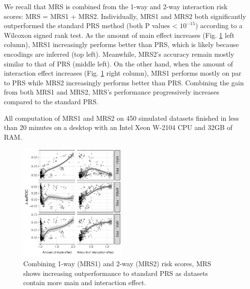 \documentclass[a4paper,twoside, 9pt]{article}
\begin{document}
\noindent We recall that MRS is combined from the 1-way and 2-way interaction risk scores: MRS = MRS1 + MRS2.
Individually, MRS1 and MRS2 both significantly outperformed the standard
PRS method (both P values \textless{} \(10^{-15}\)) according to a
Wilcoxon signed rank test. As the amount of main effect increases (Fig.
\ref{fig:improvements} left column), MRS1 increasingly performs better
than PRS, which is likely because encodings are inferred (top left).
Meanwhile, MRS2's accuracy remain mostly similar to that of PRS (middle
left). On the other hand, when the amount of interaction effect
increases (Fig. \ref{fig:improvements} right column), MRS1 performs
mostly on par to PRS while MRS2 increasingly performs better than PRS.
Combining the gain from both MRS1 and MRS2, MRS's performance
progressively increases compared to the standard PRS.

All computation of MRS1 and MRS2 on 450 simulated datasets finished in less than 20 minutes on a desktop with an Intel Xeon W-2104 CPU and 32GB of RAM.

\begin{figure}
\centering
\includegraphics[width=0.48\textwidth]{images/improvements_train_ms.pdf}
\caption{Combining 1-way (MRS1) and 2-way (MRS2) risk scores, MRS shows
increasing outperformance to standard PRS as datasets contain more main
and interaction effect.\label{fig:improvements}}
\end{figure}


%
%
%
\end{document}
